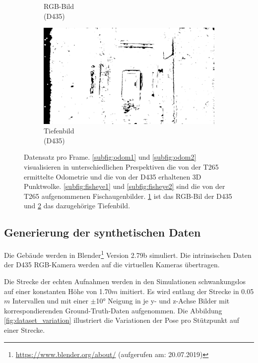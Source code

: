 \begin{figure}[H]
\begin{subfigure}[t]{0.3\linewidth}
		\caption{RGB-Bild \\ (D435) \hspace*{2cm}}
		\label{subfig:rgb-image}
	\end{subfigure}
	\hfill
	\begin{subfigure}[t]{0.3\linewidth}
		\centering
		\includegraphics[width=\linewidth]{images/real_dataset/dt_frame000005.png}
		\caption{Tiefenbild \\ (D435) \hspace*{2cm}}
		\label{subfig:depth-image}
	\end{subfigure}
	\caption{Datensatz pro Frame. \ref{subfig:odom1}  und \ref{subfig:odom2} visualisieren in unterschiedlichen Prespektiven die von der T265 ermittelte Odometrie und die von der D435 erhaltenen 3D Punktwolke. \ref{subfig:fisheye1} und \ref{subfig:fisheye2} sind die von der T265 aufgenommenen Fischaugenbilder. \ref{subfig:rgb-image} ist das RGB-Bil der D435 und \ref{subfig:depth-image} das dazugehörige Tiefenbild. }
	\label{fig:dataset}
\end{figure}


\subsection{Generierung der synthetischen Daten}
\label{subsec:generate_synth_images}

Die Gebäude werden in Blender\footnote{\url{https://www.blender.org/about/} (aufgerufen am: 20.07.2019)} Version 2.79b simuliert. Die intrinsischen Daten der D435 RGB-Kamera werden auf die virtuellen Kameras übertragen.

Die Strecke der echten Aufnahmen werden in den Simulationen schwankungslos auf einer konstanten Höhe von 1.70$m$ imitiert. Es wird entlang der Strecke in 0.05$m$ Intervallen und mit einer $\pm$10° Neigung in je y- und z-Achse Bilder mit korrespondierenden Ground-Truth-Daten aufgenommen. Die Abbildung \ref{fig:dataset_variation} illustriert die Variationen der Pose pro Stützpunkt auf einer Strecke.


